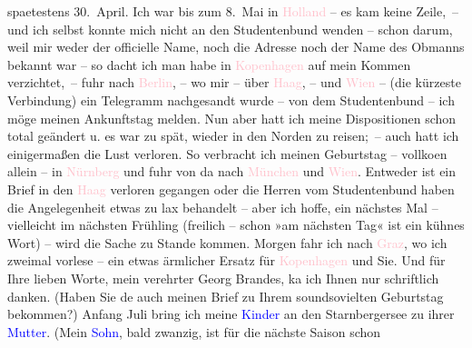                     spaetestens 30. April. Ich war bis zum 8. Mai in \textcolor{pink}{Holland}{}\ledrightnote{\textcolor{pink}{Niederlande}} – es kam keine Zeile, – und ich
                    selbst konnte mich nicht an den Studentenbund wenden – schon darum, weil mir
                    weder der officielle Name, noch die Adresse noch der Name des Obmanns {\pb}bekannt war – so dacht ich man habe in \textcolor{pink}{Kopenhagen}{}\ledrightnote{\textcolor{pink}{Kopenhagen}} auf mein Kommen verzichtet, – fuhr
               nach \textcolor{pink}{Berlin}{}\ledrightnote{\textcolor{pink}{Berlin}}, – wo mir – über \textcolor{pink}{Haag}{}\ledrightnote{\textcolor{pink}{Den Haag}}, – und \textcolor{pink}{Wien}{}\ledrightnote{\textcolor{pink}{Wien}} – (die
                    kürzeste Verbindung) ein Telegramm nachgesandt wurde – von dem Studentenbund –
                    ich möge meinen Ankunftstag melden. Nun aber hatt ich meine Dispositionen schon
                    total geändert u. es war zu spät, wieder in den Norden zu reisen; – auch hatt
                    ich einigermaßen die Lust verloren. So verbracht ich meinen Geburtstag –
                        vollko{\geminationm}en allein – in \textcolor{pink}{Nürnberg}{}\ledrightnote{\textcolor{pink}{Nürnberg}} und fuhr von da nach \textcolor{pink}{München}{}\ledrightnote{\textcolor{pink}{München}} und \textcolor{pink}{Wien}{}\ledrightnote{\textcolor{pink}{Wien}}. Entweder
               ist ein Brief in den \textcolor{pink}{Haag}{}\ledrightnote{\textcolor{pink}{Den Haag}} verloren gegangen
                    oder die Herren vom Studentenbund haben die Angelegenheit etwas zu lax behandelt
                    – aber ich hoffe, ein nächstes Mal – vielleicht im nächsten Frühling (freilich –
                    schon »am nächsten Tag« ist ein kühnes Wort) – wird die Sache zu Stande kommen.
                        {\pb}Morgen fahr ich nach \textcolor{pink}{Graz}{}\ledrightnote{\textcolor{pink}{Graz}}, wo ich zweimal vorlese – ein etwas ärmlicher Ersatz
                    für \textcolor{pink}{Kopenhagen}{}\ledrightnote{\textcolor{pink}{Kopenhagen}} und Sie.\pend
           \pstart
           Und für Ihre lieben Worte, mein verehrter Georg Brandes, ka{\geminationn} ich Ihnen nur schriftlich danken. (Haben Sie
                        de{\geminationn} auch meinen Brief zu Ihrem soundsovielten
                    Geburtstag bekommen?)\pend
           \pstart
           Anfang Juli bring ich meine \textcolor{blue}{Kinder}{} an den Starnbergersee zu ihrer \textcolor{blue}{Mutter}{}. (Mein \textcolor{blue}{Sohn}{}, bald zwanzig, ist für die nächste Saison schon
